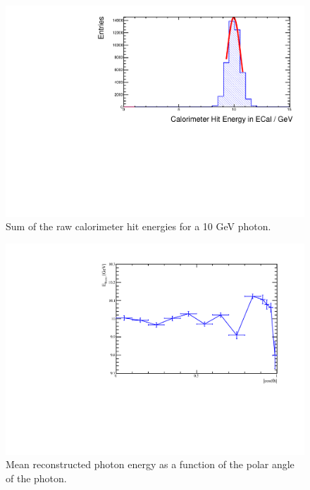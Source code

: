 \begin{figure}
  \includegraphics[width=\largefigwidth]{EnergyEstimators/Plots/Calibration/ECalDigitsation.pdf}
  \caption[Sum of the raw calorimeter hit energies for a 10 GeV photon.]{Sum of the raw calorimeter hit energies for a 10 GeV photon.}
  \label{engest:fig:ecaldigi}
\end{figure}




\begin{figure}
  \includegraphics[width=\largefigwidth]{EnergyEstimators/Plots/Calibration/Validation/AngularDistributionPhotonPlot.pdf}
  \caption[Mean reconstructed photon energy as a function of the polar angle of the photon.]{Mean reconstructed photon energy as a function of the polar angle of the photon.}
  \label{engest:fig:photonangle}
\end{figure}


